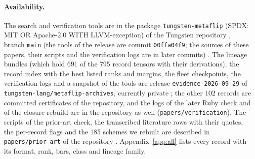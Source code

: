 \paragraph{Availability.}
The search and verification tools are in the package \texttt{tungsten-metaflip} (SPDX: MIT OR Apache-2.0 WITH LLVM-exception) of the Tungsten repository \cite{tungsten2026lang}, branch \texttt{main} (the tools of the release are commit \texttt{00ffa04f9}; the sources of these papers, their scripts and the verification logs are in later commits) .
The lineage bundles (which hold 691 of the 795 record tensors with their derivations), the record index with the best listed ranks and margins, the fleet checkpoints, the verification logs and a snapshot of the tools are release \texttt{evidence-2026-09-29} of \texttt{tungsten-lang/metaflip-archives}, currently private ; the other 102 records are committed certificates of the repository, and the logs of the later Ruby check and of the closure rebuild are in the repository as well (\texttt{papers/verification}). The scripts of the prior-art check, the transcribed literature rows with their quotes, the per-record flags and the 185 schemes we rebuilt are described in \texttt{papers/prior-art} of the repository . Appendix~\ref{app:all} lists every record with its format, rank, bars, class and lineage family.
